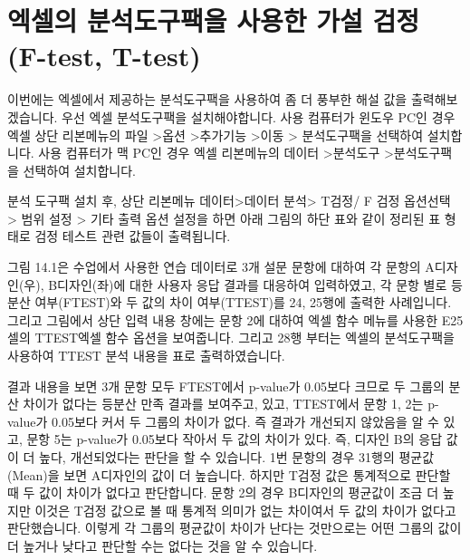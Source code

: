 \documentclass[
  letterpaper,
]{book}
\begin{document}
\section{엑셀의 분석도구팩을 사용한 가설 검정 (F-test,
T-test)}\label{uxc5d1uxc140uxc758-uxbd84uxc11duxb3c4uxad6cuxd329uxc744-uxc0acuxc6a9uxd55c-uxac00uxc124-uxac80uxc815-f-test-t-test}

이번에는 엑셀에서 제공하는 분석도구팩을 사용하여 좀 더 풍부한 해설 값을
출력해보겠습니다. 우선 엑셀 분석도구팩을 설치해야합니다. 사용 컴퓨터가
윈도우 PC인 경우 엑셀 상단 리본메뉴의 파일 \textgreater 옵션
\textgreater 추가기능 \textgreater 이동 \textgreater{} 분석도구팩을
선택하여 설치합니다. 사용 컴퓨터가 맥 PC인 경우 엑셀 리본메뉴의 데이터
\textgreater 분석도구 \textgreater 분석도구팩을 선택하여 설치합니다.

분석 도구팩 설치 후, 상단 리본메뉴 데이터\textgreater 데이터
분석\textgreater{} T검정/ F 검정 옵션선택 \textgreater{} 범위 설정
\textgreater{} 기타 출력 옵션 설정을 하면 아래 그림의 하단 표와 같이
정리된 표 형태로 검정 테스트 관련 값들이 출력됩니다.

그림 14.1은 수업에서 사용한 연습 데이터로 3개 설문 문항에 대하여 각
문항의 A디자인(우), B디자인(좌)에 대한 사용자 응답 결과를 대응하여
입력하였고, 각 문항 별로 등분산 여부(FTEST)와 두 값의 차이 여부(TTEST)를
24, 25행에 출력한 사례입니다. 그리고 그림에서 상단 입력 내용 창에는 문항
2에 대하여 엑셀 함수 메뉴를 사용한 E25셀의 TTEST엑셀 함수 옵션을
보여줍니다. 그리고 28행 부터는 엑셀의 분석도구팩을 사용하여 TTEST 분석
내용을 표로 출력하였습니다.

결과 내용을 보면 3개 문항 모두 FTEST에서 p-value가 0.05보다 크므로 두
그룹의 분산 차이가 없다는 등분산 만족 결과를 보여주고, 있고, TTEST에서
문항 1, 2는 p-value가 0.05보다 커서 두 그룹의 차이가 없다. 즉 결과가
개선되지 않았음을 알 수 있고, 문항 5는 p-value가 0.05보다 작아서 두 값의
차이가 있다. 즉, 디자인 B의 응답 값이 더 높다, 개선되었다는 판단을 할 수
있습니다. 1번 문항의 경우 31행의 평균값(Mean)을 보면 A디자인의 값이 더
높습니다. 하지만 T검정 값은 통계적으로 판단할 때 두 값이 차이가 없다고
판단합니다. 문항 2의 경우 B디자인의 평균값이 조금 더 높지만 이것은 T검정
값으로 볼 때 통계적 의미가 없는 차이여서 두 값의 차이가 없다고
판단했습니다. 이렇게 각 그룹의 평균값이 차이가 난다는 것만으로는 어떤
그룹의 값이 더 높거나 낮다고 판단할 수는 없다는 것을 알 수 있습니다.
\end{document}
